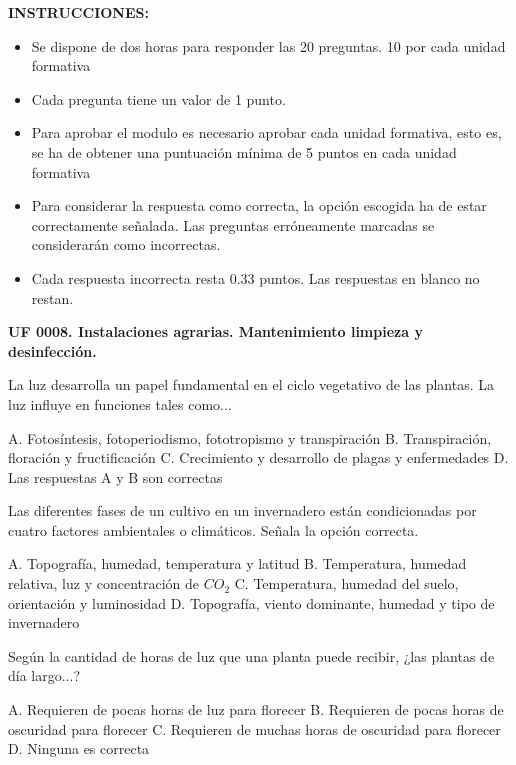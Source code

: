 \documentclass[answers,11pt]{exam}
\begin{document}
{\selectfont
\textbf{INSTRUCCIONES:}
\begin{itemize}
    \item Se dispone de dos horas para responder las 20 preguntas. 10 por cada unidad formativa
    \item Cada pregunta tiene un valor de 1 punto.
    \item Para aprobar el modulo es necesario aprobar cada unidad formativa,
      esto es, se ha de obtener una puntuación mínima de 5 puntos en cada unidad
      formativa 
    \item Para considerar la respuesta como correcta, la opción escogida ha de
      estar correctamente señalada. Las preguntas erróneamente marcadas se
      considerarán como incorrectas. 
    \item Cada respuesta incorrecta resta 0.33 puntos. Las respuestas en blanco no restan. 
\end{itemize}
\vspace{1cm}


  \textbf{UF 0008. Instalaciones agrarias. Mantenimiento limpieza y
    desinfección.}

\begin{questions}
  \question La luz desarrolla un papel fundamental en el ciclo vegetativo de las
    plantas. La luz influye en funciones tales como...
    \begin{checkboxes}
      \choice A. Fotosíntesis, fotoperiodismo, fototropismo y transpiración
      \choice B. Transpiración, floración y fructificación
      \choice C. Crecimiento y desarrollo de plagas y enfermedades
      \CorrectChoice D. Las respuestas A y B son correctas
    \end{checkboxes}

    \question Las diferentes fases de un cultivo en un invernadero están
    condicionadas por cuatro factores ambientales o climáticos. Señala la opción
    correcta.
    \begin{checkboxes}
      \choice A. Topografía, humedad, temperatura y latitud
      \CorrectChoice B. Temperatura, humedad relativa, luz y concentración de
     $CO_2$
      \choice C. Temperatura, humedad del suelo, orientación y luminosidad
      \choice D. Topografía, viento dominante, humedad y tipo de invernadero
    \end{checkboxes}

  \question Según la cantidad de horas de luz que una planta puede recibir, ¿las
    plantas de día largo...?
    \begin{checkboxes}
      \choice A. Requieren de pocas horas de luz para florecer
      \CorrectChoice B. Requieren de pocas horas de oscuridad para florecer
      \choice C. Requieren de muchas horas de oscuridad para florecer
      \choice D. Ninguna es correcta
    \end{checkboxes}
    

\end{questions}}
\end{document}
